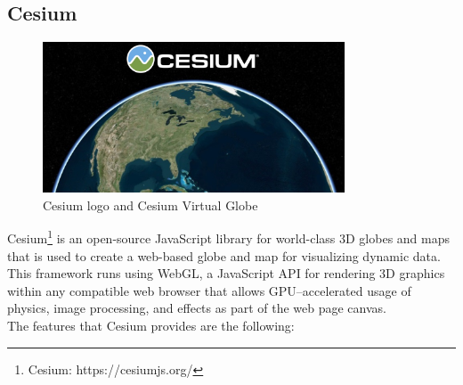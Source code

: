\subsection{Cesium}
\begin{figure} [H]
\centering
\includegraphics[width=0.8\textwidth]{chapter2/images/cesium_logo}
\caption{Cesium logo and Cesium Virtual Globe}
\label{fig:cesium_logo}
\end{figure}
Cesium\footnote{Cesium: https://cesiumjs.org/} is an open-source JavaScript library for world-class 3D globes and maps that is used to create a web-based globe and map for visualizing dynamic data. This framework runs using WebGL, a JavaScript API for rendering 3D graphics within any compatible web browser that allows GPU--accelerated usage of physics, image processing, and effects as part of the web page canvas.\\ 
The features that Cesium provides are the following:
